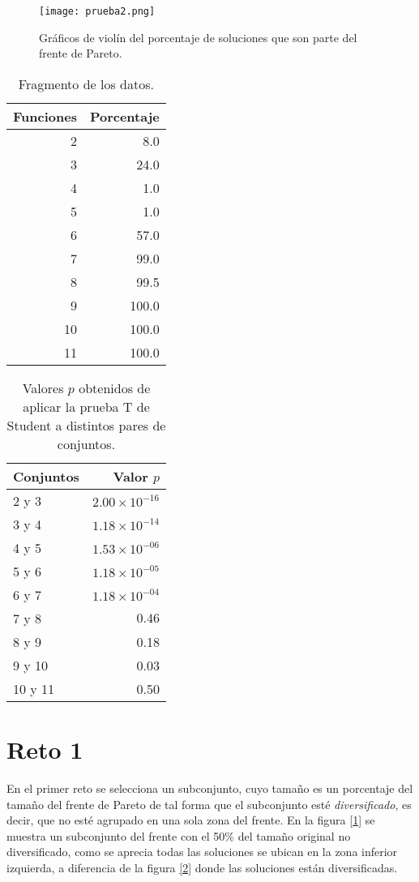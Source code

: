 \documentclass[12pt,letterpaper]{article}
\begin{document}
 \begin{figure}
 	\centering 
		\texttt{[image: prueba2.png]} 		
		\caption{Gráficos de violín del porcentaje de soluciones que son parte del frente de Pareto.}
		 		\label{im}
 	\end{figure}  




\begin{table}
\centering
\caption{Fragmento de los datos.}
\begin{tabular}{rr}
  \hline
Funciones & Porcentaje \\ 
  \hline
2 & 8.0 \\
3 & 24.0\\
4 & 1.0 \\
5 & 1.0 \\
6 & 57.0 \\
7 & 99.0 \\
8 & 99.5 \\
9 & 100.0\\
10 & 100.0\\
11 & 100.0\\
\hline
\end{tabular}
\label{data}
\end{table}

\begin{table}
\centering
\caption{Valores $p$ obtenidos de aplicar la prueba T de Student a distintos pares de conjuntos.}
\begin{tabular}{lr}
  \hline
Conjuntos & Valor $p$ \\ 
  \hline
2 y 3& $2.00\times 10^{-16}$ \\
3 y 4 & $1.18 \times 10^{-14}$\\
4 y 5 & $1.53 \times 10^{-06} $ \\
5 y 6 & $1.18 \times 10^{-05} $ \\
6 y 7 & $1.18 \times 10^{-04} $ \\
7 y 8 & $0.46$ \\
8 y 9 & 0.18 \\
9 y 10 & 0.03\\
10 y 11 & 0.50\\

\hline
\end{tabular}
\label{p}
\end{table}

\section{Reto 1}
En el primer reto se selecciona un subconjunto, cuyo tamaño es un porcentaje del tamaño del frente de Pareto de tal forma que el subconjunto esté \textit{diversificado}, es decir, que no esté agrupado en una sola zona del frente. En la figura \ref{1} se muestra un subconjunto del frente con el 50\% del tamaño original no diversificado, como se aprecia todas las soluciones se ubican en la zona inferior izquierda, a diferencia de la figura \ref{2} donde las soluciones están diversificadas.
\end{document}
